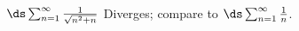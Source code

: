 {$\ds \sum_{n=1}^\infty \frac{1}{\sqrt{n^2+n}}$
}
{Diverges; compare to $\ds \sum_{n=1}^\infty \frac {1}{n}$.
}